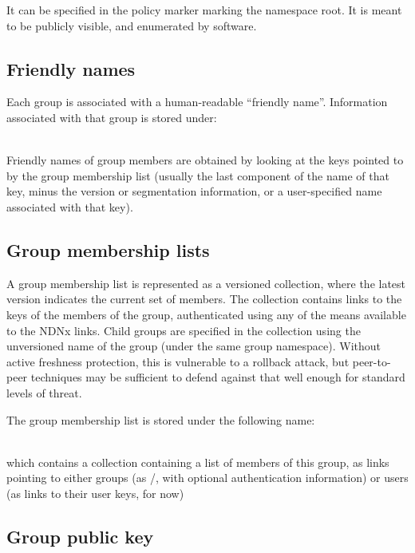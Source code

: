 It can be specified in the policy marker marking the namespace
root. It is meant to be publicly visible, and enumerated by software.


\subsection{Friendly names}

Each group is associated with a human-readable ``friendly
name''. Information associated with that group is stored under:

\\

Friendly names of group members are obtained by looking at the keys
pointed to by the group membership list (usually the last component of
the name of that key, minus the version or segmentation information,
or a user-specified name associated with that key).


\subsection{Group membership lists}

A group membership list is represented as a versioned collection,
where the latest version indicates the current set of members. The
collection contains links to the keys of the members of the group,
authenticated using any of the means available to the NDNx
links. Child groups are specified in the collection using the
unversioned name of the group (under the same group
namespace). Without active freshness protection, this is vulnerable to
a rollback attack, but peer-to-peer techniques may be sufficient to
defend against that well enough for standard levels of threat.

The group membership list is stored under the following name:

\\

which contains a collection containing a list of members of this
group, as links pointing to either groups (as /, with optional
authentication information) or users (as links to their user keys, for
now)


\subsection{Group public key}

